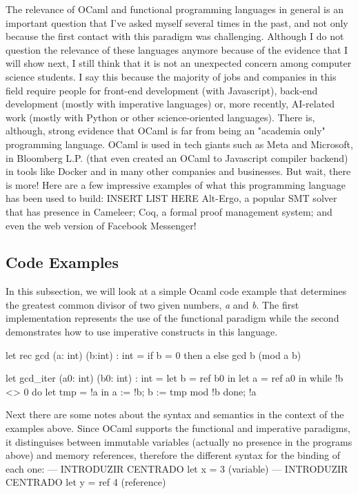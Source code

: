 The relevance of OCaml and functional programming languages in general is an important question that I've asked myself several times in the past, and not only because the first contact with this paradigm was challenging.
Although I do not question the relevance of these languages anymore because of the evidence that I will show next, I still think that it is not an unexpected concern among computer science students.
I say this because the majority of jobs and companies in this field require people for front-end development (with Javascript), back-end development (mostly with imperative languages) or, more recently, AI-related work (mostly with Python or other science-oriented languages).
There is, although, strong evidence that OCaml is far from being an "academia only" programming language.
OCaml is used in tech giants such as Meta and Microsoft, in Bloomberg L.P. (that even created an OCaml to Javascript compiler backend) in tools like Docker and in many other companies and businesses.
But wait, there is more! Here are a few impressive examples of what this programming language has been used to build: INSERT LIST HERE
Alt-Ergo, a popular SMT solver that has presence in Cameleer;
Coq, a formal proof management system;
and even the web version of Facebook Messenger!

\subsection{Code Examples} 
\label{sub:examples_ocaml}

In this subsection, we will look at a simple Ocaml code example that determines the greatest common divisor of two given numbers, \emph{a} and \emph{b}.
The first implementation represents the use of the functional paradigm while the second demonstrates how to use imperative constructs in this language.

\begin{ocamlsmall}
  let rec gcd (a: int) (b:int) : int =
      if b = 0 then a
      else gcd b (mod a b) 
\end{ocamlsmall}

\begin{ocamlsmall}
  let gcd_iter (a0: int) (b0: int) : int =
      let b = ref b0 in
      let a = ref a0 in
      while !b <> 0 do
          let tmp = !a in
          a := !b;
          b := tmp mod !b
      done;
      !a
\end{ocamlsmall}

Next there are some notes about the syntax and semantics in the context of the examples above. 
Since OCaml supports the functional and imperative paradigms, it distinguises between immutable variables (actually no presence in the programs above) and memory references, therefore the different syntax for the binding of each one: 
--- INTRODUZIR CENTRADO let x = 3 (variable)
--- INTRODUZIR CENTRADO let y = ref 4 (reference)

